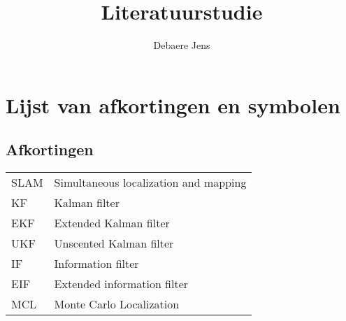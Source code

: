 \documentclass{book}
\title{Literatuurstudie}
\author{Debaere Jens}
\begin{document}
	\maketitle
	
	
		
	

\setcounter{chapter}{-1}
\chapter{Lijst van afkortingen en symbolen}
\section*{Afkortingen}
\begin{flushleft}
\renewcommand{\arraystretch}{1.1}
	\begin{tabularx}{\textwidth}{@{}p{12mm}X@{}}
    SLAM  & Simultaneous localization and mapping \\
    KF 	  & Kalman filter\\
    EKF   & Extended Kalman filter\\
    UKF   & Unscented Kalman filter\\
    IF    & Information filter\\
    EIF   & Extended information filter\\
    MCL   & Monte Carlo Localization \\
\end{tabularx}
\end{flushleft}
\end{document}
